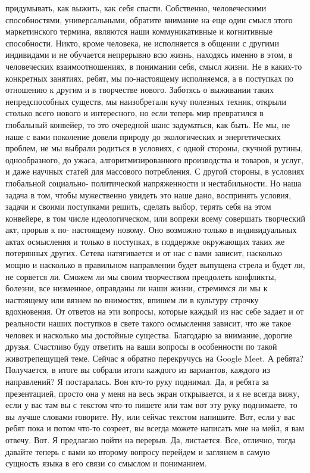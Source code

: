 придумывать, как выжить, как себя спасти. Собственно, человеческими
способностями, универсальными, обратите внимание на еще один смысл этого
маркетинского термина, являются наши коммуникативные и когнитивные способности.
Никто, кроме человека, не исполняется в общении с другими индивидами и не
обучается непрерывно всю жизнь, находясь именно в этом, в человеческих
взаимоотношениях, в понимании себя, смысл жизни. Не в каких-то конкретных
занятиях, ребят, мы по-настоящему исполняемся, а в поступках по отношению к
другим и в творчестве нового. Заботясь о выживании таких непредспособных
существ, мы наизобретали кучу полезных техник, открыли столько всего нового и
интересного, но если теперь мир превратился в глобальный конвейер, то это
очередной шанс задуматься, как быть. Не мы, не наше с вами поколение довели
природу до экологических и энергетических проблем, не мы выбрали родиться в
условиях, с одной стороны, скучной рутины, однообразного, до ужаса,
алгоритмизированного производства и товаров, и услуг, и даже научных статей для
массового потребления. С другой стороны, в условиях глобальной социально-
политической напряженности и нестабильности. Но наша задача в том, чтобы
мужественно увидеть это наше дано, воспринять условия, задачи и своими
поступками решить, сделать выбор, терять себя на этом конвейере, в том числе
идеологическом, или вопреки всему совершать творческий акт, прорыв к по-
настоящему новому. Оно возможно только в индивидуальных актах осмысления и
только в поступках, в поддержке окружающих таких же потерянных других. Сетева
натягивается и от нас с вами зависит, насколько мощно и насколько в правильном
направлении будет выпущена стрела и будет ли, не сорвется ли. Сможем ли мы своим
творчеством преодолеть конфликты, болезни, все низменное, оправданы ли наши
жизни, стремимся ли мы к настоящему или вязнем во внимостях, впишем ли в
культуру строчку вдохновения. От ответов на эти вопросы, которые каждый из нас
себе задает и от реальности наших поступков в свете такого осмысления зависит,
что же такое человек и насколько мы достойные существа. Благодарю за внимание,
дорогие друзья. Счастливо буду ответить на ваши вопросы в особенности по такой
животрепещущей теме. Сейчас я обратно перекручусь на Google Meet. А ребята?
Получается, в итоге вы собрали итоги каждого из вариантов, каждого из
направлений? Я постаралась. Вон кто-то руку поднимал. Да, я ребята за
презентацией, просто она у меня на весь экран открывается, и я не всегда вижу,
если у вас там вы с текстом что-то пишете или там вот эту руку поднимаете, то вы
лучше словами говорите. Ну, или сейчас текстом напишите. Вот, если у вас ребят
пока и потом что-то созреет, вы всегда можете написать мне на мейл, я вам
отвечу. Вот. Я предлагаю пойти на перерыв. Да, листается. Все, отлично, тогда
давайте теперь с вами ко второму вопросу перейдем и заглянем в самую сущность
языка в его связи со смыслом и пониманием. 

